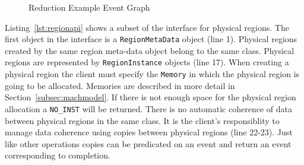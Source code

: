 \begin{figure}
\centering
{}
\caption{Reduction Example Event Graph\label{fig:reducevents}}
\end{figure}

Listing~\ref{lst:regionapi} shows a subset of the interface for physical regions.  The
first object in the interface is a {\tt RegionMetaData} object (line 1).  Physical
regions created by the same region meta-data object belong to the same class.  Physical
regions are represented by {\tt RegionInstance} objects (line 17).  When creating a physical
region the client must specify the {\tt Memory} in which the physical region is going
to be allocated.  Memories are described in more detail in Section~\ref{subsec:machmodel}.
If there is not enough space for the physical region allocation a {\tt NO\_INST} will
be returned.  There is no automatic coherence of data between physical regions in the
same class.  It is the client's responsiblity to manage data coherence using copies
between physical regions (line 22-23).  Just like other operations copies can be
predicated on an event and return an event corresponding to completion.


